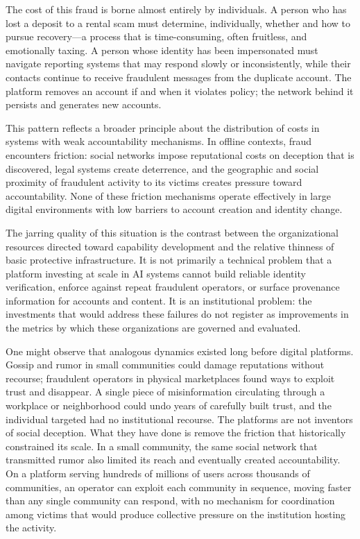 \documentclass[12pt,a4paper]{article}
\begin{document}
The cost of this fraud is borne almost entirely by individuals. A person who has lost a deposit
to a rental scam must determine, individually, whether and how to pursue recovery---a process
that is time-consuming, often fruitless, and emotionally taxing. A person whose identity has been
impersonated must navigate reporting systems that may respond slowly or inconsistently, while
their contacts continue to receive fraudulent messages from the duplicate account. The platform
removes an account if and when it violates policy; the network behind it persists and generates
new accounts.

This pattern reflects a broader principle about the distribution of costs in systems with weak
accountability mechanisms. In offline contexts, fraud encounters friction: social networks impose
reputational costs on deception that is discovered, legal systems create deterrence, and the
geographic and social proximity of fraudulent activity to its victims creates pressure toward
accountability. None of these friction mechanisms operate effectively in large digital environments
with low barriers to account creation and identity change.

The jarring quality of this situation is the contrast between the organizational resources
directed toward capability development and the relative thinness of basic protective
infrastructure. It is not primarily a technical problem that a platform investing at scale in AI
systems cannot build reliable identity verification, enforce against repeat fraudulent operators,
or surface provenance information for accounts and content. It is an institutional problem: the
investments that would address these failures do not register as improvements in the metrics by
which these organizations are governed and evaluated.

One might observe that analogous dynamics existed long before digital platforms. Gossip and
rumor in small communities could damage reputations without recourse; fraudulent operators in
physical marketplaces found ways to exploit trust and disappear. A single piece of misinformation
circulating through a workplace or neighborhood could undo years of carefully built trust, and the
individual targeted had no institutional recourse. The platforms are not inventors of social
deception. What they have done is remove the friction that historically constrained its scale.
In a small community, the same social network that transmitted rumor also limited its reach and
eventually created accountability. On a platform serving hundreds of millions of users across
thousands of communities, an operator can exploit each community in sequence, moving faster than
any single community can respond, with no mechanism for coordination among victims that would
produce collective pressure on the institution hosting the activity.
\end{document}
